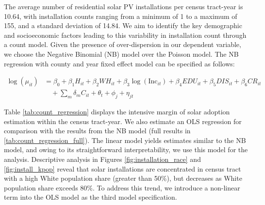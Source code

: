 \documentclass[12pt,twoside,letterpaper]{article}
\begin{document}
The average number of residential solar PV installations per census tract-year is 10.64, with installation counts ranging from a minimum of 1 to a maximum of 155, and a standard deviation of 14.84. We aim to identify the key demographic and socioeconomic factors leading to this variability in installation count through a count model. Given the presence of over-dispersion in our dependent variable, we choose the Negative Binomial (NB) model over the Poisson model. The NB regression with county and year fixed effect model can be specified as follows:

\begin{equation}
\label{reg_2}
\begin{aligned}
\log(\mu_{it}) &= \beta_{0} + \beta_{1}H_{it} + \beta_{2}WH_{it} + \beta_{3}\log(\text{Inc}_{it}) + \beta_{4}EDU_{it} + \beta_{5}DIS_{it} + \beta_{6}CR_{it} \\
&\quad + \sum_{m}\delta_{m}C_{it} + \theta_{t} + \phi_{j} + \eta_{jt}
\end{aligned}
\end{equation}

Table \ref{tab:count_regression} displays the intensive margin of solar adoption estimation within the census tract-year. We also estimate an OLS regression for comparison with the results from the NB model (full results in \autoref{tab:count_regression_full}). The linear model yields estimates similar to the NB model, and owing to its straightforward interpretability, we use this model for the analysis. Descriptive analysis in Figures \ref{fig:installation_race} and \ref{fig:install_kpop} reveal that solar installations are concentrated in census tract with a high White population share (greater than 50\%), but decreases as White population share exceeds 80\%. To address this trend, we introduce a non-linear term into the OLS model as the third model specification. 
\end{document}
